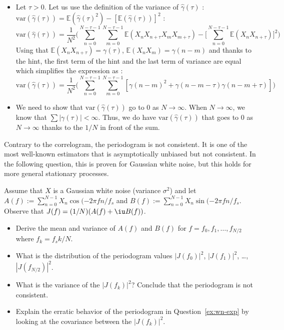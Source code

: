 \documentclass[11pt]{article}
\begin{document}
\begin{solution}
    \begin{itemize}
        \item Let $\tau>0$. Let us use the definition of the variance of $\hat{\gamma}(\tau)$ : $\text{var}(\hat{\gamma}(\tau))=\mathbb{E}(\hat{\gamma}(\tau)^2)-[\mathbb{E}(\hat{\gamma}(\tau))]^2$ :
        \begin{equation}
            \text{var}(\hat{\gamma}(\tau))=\frac{1}{N^2}\bigg(\sum_{n=0}^{N-\tau-1}\sum_{m=0}^{N-\tau-1}\mathbb{E}(X_nX_{n+\tau}X_mX_{m+\tau})-\bigg[\sum_{n=0}^{N-\tau-1}\mathbb{E}(X_nX_{n+\tau})\bigg]^2\bigg)
        \end{equation}
        Using that $\mathbb{E}(X_nX_{n+\tau})=\gamma(\tau)$, $\mathbb{E}(X_nX_m)=\gamma(n-m)$ and thanks to the hint, the first term of the hint and the last term of variance are equal which simplifies the expression as :
        \begin{equation}
            \text{var}(\hat{\gamma}(\tau))=\frac{1}{N^2}\bigg(\sum_{n=0}^{N-\tau-1}\sum_{m=0}^{N-\tau-1}[\gamma(n-m)^2+\gamma(n-m-\tau)\gamma(n-m+\tau)]\bigg)
        \end{equation}
        \item We need to show that $\text{var}(\hat{\gamma}(\tau))$ go to 0 as $N\to\infty$. When $N\to\infty$, we know that  $\sum|\gamma(\tau)|<\infty$. Thus, we do have $\text{var}(\hat{\gamma}(\tau))$ that goes to 0 as $N\to\infty$ thanks to the $1/N$ in front of the sum.
    \end{itemize}
\end{solution}

Contrary to the correlogram, the periodogram is not consistent.
It is one of the most well-known estimators that is asymptotically unbiased but not consistent.
In the following question, this is proven for Gaussian white noise, but this holds for more general stationary processes.
\begin{exercise}
    Assume that $X$ is a Gaussian white noise (variance $\sigma^2$) and let $A(f):=\sum_{n=0}^{N-1} X_n \cos(-2\pi f n/f_s$ and $B(f):=\sum_{n=0}^{N-1} X_n \sin(-2\pi f n/f_s$.
    Observe that $J(f) = (1/N) (A(f) + \iu B(f))$.
    \begin{itemize}
        \item Derive the mean and variance of $A(f)$ and $B(f)$ for $f=f_0, f_1,\dots, f_{N/2}$ where $f_k=f_s k/N$.
        \item What is the distribution of the periodogram values $|J(f_0)|^2$, $|J(f_1)|^2$, \dots, $|J(f_{N/2})|^2$.
        \item What is the variance of the $|J(f_k)|^2$? Conclude that the periodogram is not consistent.
        \item Explain the erratic behavior of the periodogram in Question~\ref{ex:wn-exp} by looking at the covariance between the $|J(f_k)|^2$.
    \end{itemize}
    
\end{exercise}
\end{document}
